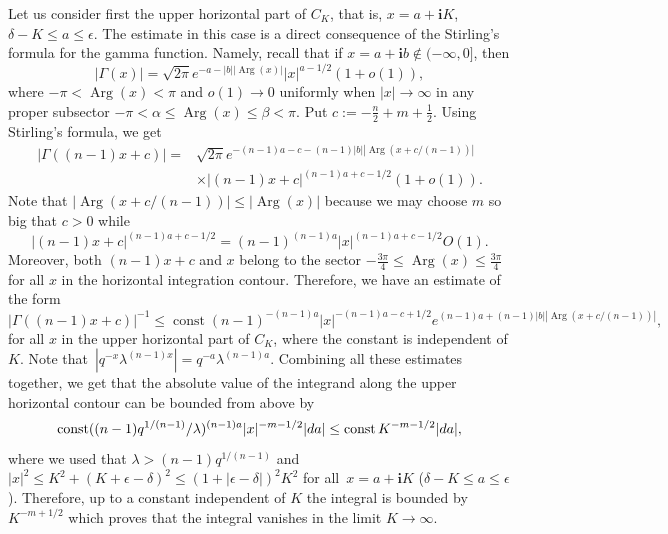 \documentclass[10pt,a4paper]{article}
\numberwithin{equation}{section}
\newcommand{\ii}{\mathbf{i}}
\begin{document}
Let us consider first the upper horizontal part of $C_K$, that is, $x=a + \ii K$, $\delta-K\leq a \leq \epsilon$. The estimate in this case is a direct consequence of the Stirling's formula for the gamma function. Namely, recall that if $x=a+\ii b\notin (-\infty, 0]$, then
\[
|\Gamma(x)|=
\sqrt{2\pi}
e^{-a-|b| |{\operatorname{Arg}}(x)|}|x|^{a-1/2}(1+o(1)),
\]
where $-\pi< \operatorname{Arg}(x)<\pi$ and $o(1)\to 0$ uniformly when $|x|\to \infty$ in any proper subsector $-\pi<\alpha\leq \operatorname{Arg}(x)\leq \beta<\pi$.
Put $c:=-\tfrac{n}{2} + m +\tfrac{1}{2}$. Using Stirling's formula, we get
\begin{align*}
|\Gamma((n-1)x+c)|={}& \sqrt{2\pi}
e^{-(n-1) a -c -(n-1) |b| |{\operatorname{Arg}}(x+c/(n-1))|}\\
&\times
|(n-1)x+c|^{(n-1)a+c-1/2}(1+o(1)).
\end{align*}
Note that $|{\operatorname{Arg}}(x+c/(n-1))|\leq |{\operatorname{Arg}}(x)|$ because we may choose $m$ so big that $c>0$ while
\[
|(n-1)x+c|^{(n-1)a+c-1/2}= (n-1)^{(n-1) a}
|x|^{(n-1) a + c-1/2} O(1).
\]
Moreover, both $(n-1)x+c$ and $x$ belong to the sector $-\frac{3\pi}{4}\leq \operatorname{Arg}(x)\leq \frac{3\pi}{4}$ for all $x$ in the horizontal integration contour. Therefore, we have an estimate of the form
\[
|\Gamma((n-1)x+c)|^{-1}\leq \operatorname{const}
(n-1)^{-(n-1) a}
|x|^{-(n-1) a - c+1/2}
e^{(n-1) a +(n-1) |b| |{\operatorname{Arg}}(x+c/(n-1))|},
\]
for all $x$ in the upper horizontal part of $C_K$, where the constant is independent of $K$.
Note that~${|q^{-x} \lambda^{(n-1)x}|=q^{-a} \lambda^{(n-1)a}}$. Combining all these estimates together, we get that the absolute value of the integrand along the upper horizontal contour can be bounded from above by
\[
\operatorname{const}
((n-1)q^{1/(n-1)} /\lambda)^{(n-1) a}
|x|^{-m-1/2} |{\rm d}a|\leq
\operatorname{const}
K^{-m-1/2} |{\rm d}a|,
\]
where we used that $\lambda>(n-1) q^{1/(n-1)}$ and $|x|^2\leq K^2+(K+\epsilon-\delta)^2\leq (1+|\epsilon-\delta|)^2 K^2$ for all~${x=a+\ii K}$ ($\delta-K\leq a\leq \epsilon$). Therefore, up to a constant independent of $K$ the integral is bounded by $K^{-m+1/2}$ which proves that the integral vanishes in the limit $K\to \infty$.
\end{document}

